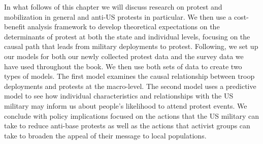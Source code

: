

In what follows of this chapter we will discuss research on protest and mobilization in general and anti-US protests in particular. We then use a cost-benefit analysis framework to develop theoretical expectations on the determinants of protest at both the state and individual levels, focusing on the causal path that leads from military deployments to protest. Following, we set up our models for both our newly collected protest data and the survey data we have used throughout the book. We then use both sets of data to create two types of models. The first model examines the causal relationship between troop deployments and protests at the macro-level. The second model uses a predictive model to see how individual characteristics and relationships with the US military may inform us about people's likelihood to attend protest events. We conclude with policy implications focused on the actions that the US military can take to reduce anti-base protests as well as the actions that activist groups can take to broaden the appeal of their message to local populations. %
